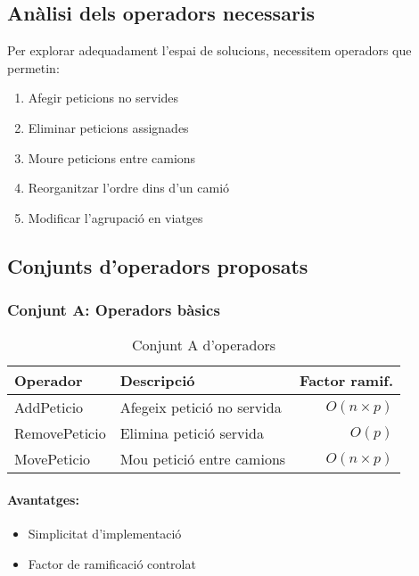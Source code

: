 \subsection{Anàlisi dels operadors necessaris}

Per explorar adequadament l'espai de solucions, necessitem operadors que permetin:

\begin{enumerate}
    \item Afegir peticions no servides
    \item Eliminar peticions assignades
    \item Moure peticions entre camions
    \item Reorganitzar l'ordre dins d'un camió
    \item Modificar l'agrupació en viatges
\end{enumerate}

\subsection{Conjunts d'operadors proposats}

\subsubsection{Conjunt A: Operadors bàsics}

\begin{table}[H]
\centering
\begin{tabular}{@{}llr@{}}
\toprule
\textbf{Operador} & \textbf{Descripció} & \textbf{Factor ramif.} \\
\midrule
AddPeticio & Afegeix petició no servida & $O(n \times p)$ \\
RemovePeticio & Elimina petició servida & $O(p)$ \\
MovePeticio & Mou petició entre camions & $O(n \times p)$ \\
\bottomrule
\end{tabular}
\caption{Conjunt A d'operadors}
\label{tab:operators-a}
\end{table}

\paragraph{Avantatges:}
\begin{itemize}
    \item Simplicitat d'implementació
    \item Factor de ramificació controlat
\end{itemize}

